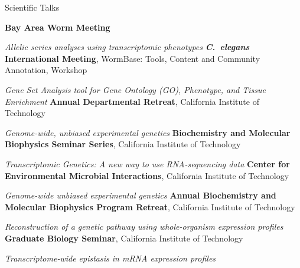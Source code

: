 \begin{rubric}{Scientific Talks}

\entry*[2018]
  \textbf{Bay Area Worm Meeting}\par
  \emph{Allelic series analyses using transcriptomic phenotypes}
\entry*[2017]
  \textbf{ \emph{C.~elegans} International Meeting}, WormBase: Tools,
  Content and Community Annotation, Workshop\par
  \emph{Gene Set Analysis tool for Gene Ontology (GO), Phenotype, and Tissue
  Enrichment}
\entry*[2017]
  \textbf{Annual Departmental Retreat}, California Institute of Technology\par
  \emph{Genome-wide, unbiased experimental genetics}
\entry*[2017]
  \textbf{Biochemistry and Molecular Biophysics Seminar Series}, California
  Institute of Technology\par
  \emph{Transcriptomic Genetics: A new way to use RNA-sequencing data}
\entry*[2017]
  \textbf{Center for Environmental Microbial Interactions}, California Institute
  of Technology\par
  \emph{Genome-wide unbiased experimental genetics}
\entry*[2016]
  \textbf{Annual Biochemistry and Molecular Biophysics Program Retreat},
  California Institute of Technology\par
  \emph{Reconstruction of a genetic pathway using whole-organism expression
  profiles}
\entry*[2016]
  \textbf{Graduate Biology Seminar}, California Institute of Technology\par
  \emph{Transcriptome-wide epistasis in mRNA expression profiles}

\end{rubric}

